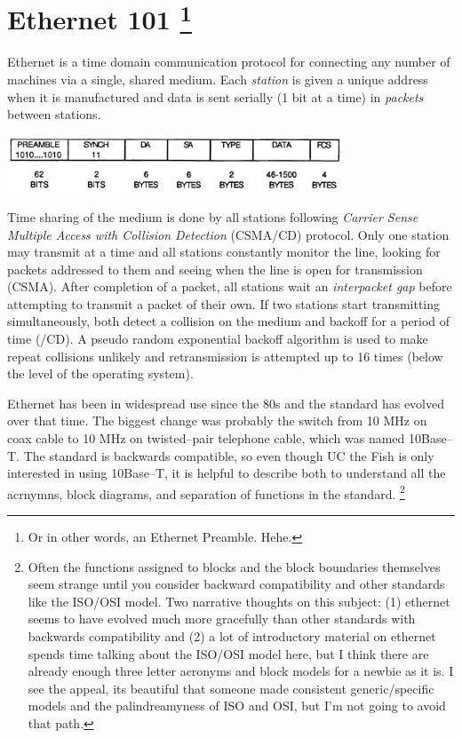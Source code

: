 \documentclass{article}
\begin{document}
\section[title]{Ethernet 101 \footnote{Or in other words, an Ethernet Preamble. Hehe.}}

Ethernet is a time domain communication protocol for connecting any number of
machines via a single, shared medium.
Each \textit{station} is given a unique address when it is manufactured and
data is sent serially (1 bit at a time) in \textit{packets} between
stations.

\begin{center}
	\includegraphics[width=0.75\textwidth]{ethernet_packet.png}
	\label{packet-format}
\end{center}

Time sharing of the medium is done by all stations following
\textit{Carrier Sense Multiple Access with Collision Detection}
(CSMA/CD) protocol.
Only one station may transmit at a time and all stations constantly
monitor the line, looking for packets addressed to them and seeing when
the line is open for transmission (CSMA).
After completion of a packet, all stations wait an
\textit{interpacket gap} before attempting to transmit a packet of their own.
If two stations start transmitting simultaneously,
both detect a collision on the medium and backoff for a period of time (/CD).
A pseudo random exponential backoff algorithm is used to make repeat
collisions unlikely and retransmission is attempted up to 16 times
(below the level of the operating system).

Ethernet has been in widespread use since the 80s and the standard has
evolved over that time.
The biggest change was probably the switch from 10 MHz on coax cable
to 10 MHz on twisted--pair telephone cable, which was named 10Base--T.
The standard is backwards compatible, so even though UC the Fish is only
interested in using 10Base--T,
it is helpful to describe both to understand all the acrnymns, block diagrams,
and separation of functions in the standard.
\footnote{Often the functions assigned to blocks and the block
boundaries themselves seem strange until you consider backward compatibility
and other standards like the ISO/OSI model.
Two narrative thoughts on this subject: (1) ethernet seems to have evolved much
more gracefully than other standards with backwards compatibility and (2)
a lot of introductory material on ethernet spends time talking
about the ISO/OSI model here, but I think there are already enough three letter
acronyms and block models for a newbie as it is.
I see the appeal, its beautiful that someone made consistent generic/specific
models and the palindreamyness of ISO and OSI, but I'm not going to avoid that path.}
\end{document}
